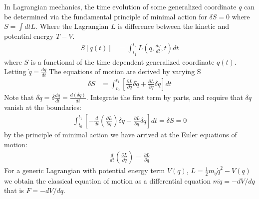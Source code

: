 In Lagrangian mechanics, the time evolution of some generalized coordinate $q$ can
be determined via the fundamental principle of minimal action for $\delta S = 0$ where $S=\int dt L$. Where the Lagrangian $L$ is difference between
 the kinetic and potential energy $T-V$. 
\begin{align*}
S[q(t)] &= \int_{t_1}^{t_2} L \left(q,\frac{dq}{dt},t\right) dt
\end{align*}
where $S$ is a functional of the time dependent generalized coordinate $q(t)$. 
Letting $\dot{q} = \frac{dq}{dt}$ The equations of motion are derived by varying S
\begin{align*}
\delta S &= \int_{t_0}^{t_1} \left [ \frac{\partial L}{\partial \dot q}  \delta \dot q + \frac{\partial L}{\partial q} \delta q \right ]dt 
\end{align*}
Note that $\delta \dot q = \delta\frac{dq}{dt} = \frac{d(\delta q)}{dt}$. 
Integrate the first term by parts, and require that $\delta q$ vanish at the boundaries:
\begin{align*}
\int_{t_0}^{t_1} \left [-\frac{d}{dt}\left (\frac{\partial L}{\partial \dot q} \right) \delta q + \frac{\partial L}{\partial q} \delta q \right ] dt  = \delta S = 0
\end{align*}
by the principle of minimal action we have arrived at the Euler equations of motion:
\begin{align*}
\frac{d}{dt}\left (\frac{\partial L}{\partial \dot q} \right) = \frac{\partial L}{\partial q}  
\end{align*}
For a generic Lagrangian with potential energy term $V(q)$, $L=\frac{1}{2}m_q \dot q^{2} - V(q)$  we obtain
the classical equation of motion as a differential equation $m\ddot{q}=-dV/dq$ that is $F=-dV/dq$.
